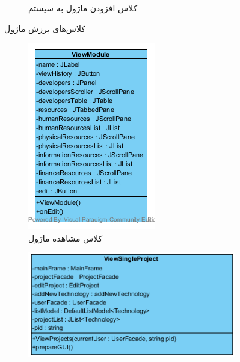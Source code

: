 \begin{figure}[H]
\begin{subfigure}[b]{0.4\textwidth}
		\caption{کلاس افزودن ماژول به سیستم}	
	\end{subfigure}
	\caption{کلاس‌های برزش ماژول}
\end{figure}

\begin{figure}[H]
	\centering
	\begin{subfigure}[b]{0.3\textwidth}
	\includegraphics[width=\textwidth]{img/class-design/ui/ViewModule.png}
	\caption{کلاس مشاهده ماژول}
	\end{subfigure}
\hfill
	\begin{subfigure}[b]{0.4\textwidth}
		\includegraphics[width=\textwidth]{img/class-design/ui/ViewSingleProject}

\end{subfigure}
\end{figure}
